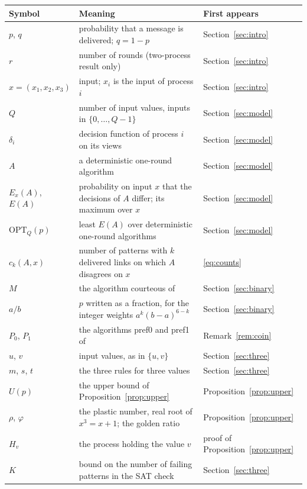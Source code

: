 \documentclass[11pt]{article}
\theoremstyle{remark}
\newcommand{\OPT}{\mathrm{OPT}}
\begin{document}
\begin{center}\begin{tabular}{@{}lp{}l@{}}\toprule
Symbol & Meaning & First appears \\ \midrule
$p$, $q$ & probability that a message is delivered; $q=1-p$ & Section~\ref{sec:intro} \\
$r$ & number of rounds (two-process result only) & Section~\ref{sec:intro} \\
$x=(x_1,x_2,x_3)$ & input; $x_i$ is the input of process $i$ & Section~\ref{sec:intro} \\
$Q$ & number of input values, inputs in $\{0,\dots,Q-1\}$ & Section~\ref{sec:model} \\
$\delta_i$ & decision function of process $i$ on its views & Section~\ref{sec:model} \\
$A$ & a deterministic one-round algorithm & Section~\ref{sec:model} \\
$E_x(A)$, $E(A)$ & probability on input $x$ that the decisions of $A$ differ; its maximum over $x$ & Section~\ref{sec:model} \\
$\OPT_Q(p)$ & least $E(A)$ over deterministic one-round algorithms & Section~\ref{sec:model} \\
$c_k(A,x)$ & number of patterns with $k$ delivered links on which $A$ disagrees on $x$ & \eqref{eq:counts} \\
$M$ & the algorithm courteous of \cite{FPR26} & Section~\ref{sec:binary} \\
$a/b$ & $p$ written as a fraction, for the integer weights $a^k(b-a)^{6-k}$ & Section~\ref{sec:binary} \\
$P_0$, $P_1$ & the algorithms pref0 and pref1 of \cite{FPR26} & Remark~\ref{rem:coin} \\
$u$, $v$ & input values, as in $\{u,v\}$ & Section~\ref{sec:three} \\
$m$, $s$, $t$ & the three rules for three values & Section~\ref{sec:three} \\
$U(p)$ & the upper bound of Proposition~\ref{prop:upper} & Proposition~\ref{prop:upper} \\
$\rho$, $\varphi$ & the plastic number, real root of $x^3=x+1$; the golden ratio & Proposition~\ref{prop:upper} \\
$H_v$ & the process holding the value $v$ & proof of Proposition~\ref{prop:upper} \\
$K$ & bound on the number of failing patterns in the SAT check & Section~\ref{sec:three} \\
\bottomrule\end{tabular}\end{center}
\end{document}

